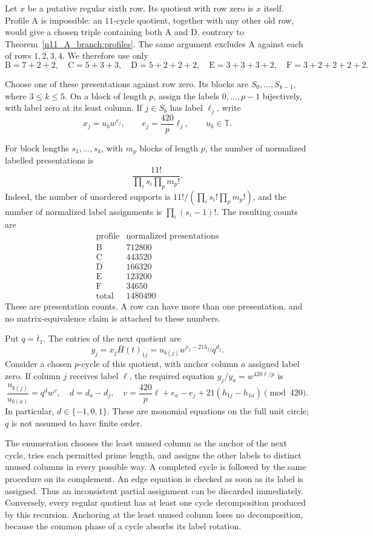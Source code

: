 \documentclass[11pt,a4paper]{article}
\theoremstyle{plain}
\theoremstyle{definition}
\theoremstyle{plain}
\begin{document}
\medskip
Let $x$ be a putative regular sixth row. Its quotient with row zero is $x$ itself. Profile $\mathrm{A}$ is impossible: an $11$-cycle quotient, together with any other old row, would give a chosen triple containing both $\mathrm{A}$ and $\mathrm{D}$, contrary to Theorem~\ref{n11_A_branch:profiles}. The same argument excludes $\mathrm{A}$ against each of rows $1,2,3,4$. We therefore use only
$$\mathrm{B}=7+2+2,\quad \mathrm{C}=5+3+3,\quad \mathrm{D}=5+2+2+2,\quad
\mathrm{E}=3+3+3+2,\quad \mathrm{F}=3+2+2+2+2.$$

Choose one of these presentations against row zero. Its blocks are $S_0,\ldots,S_{k-1}$, where $3\leq k\leq5$. On a block of length $p$, assign the labels $0,\ldots,p-1$ bijectively, with label zero at its least column. If $j\in S_b$ has label $\ell_j$, write
\[
x_j=u_bw^{e_j},\qquad e_j=\frac{420}{p}\ell_j,\qquad u_b\in\mathbb T.
\]

For block lengths $s_1,\ldots,s_k$, with $m_p$ blocks of length $p$, the number of normalized labelled presentations is
$$\frac{11!}{\prod_i s_i\prod_p m_p!}.$$
Indeed, the number of unordered supports is $11!/(\prod_i s_i!\prod_p m_p!)$, and the number of normalized label assignments is $\prod_i(s_i-1)!$. The resulting counts are
\[
\begin{array}{c|r}
\text{profile}&\text{normalized presentations}\\\hline
\mathrm{B}&712800\\\mathrm{C}&443520\\\mathrm{D}&166320\\\mathrm{E}&123200\\\mathrm{F}&34650\\\hline
\text{total}&1480490
\end{array}
\]
These are presentation counts. A row can have more than one presentation, and no matrix-equivalence claim is attached to these numbers.

Put $q=\bar t_1$. The entries of the next quotient are
$$y_j=x_j\bar H(t)_{1j}
=u_{b(j)}w^{e_j-21h_{1j}}q^{d_j}.$$
Consider a chosen $p$-cycle of this quotient, with anchor column $a$ assigned label zero. If column $j$ receives label $\ell$, the required equation $y_j/y_a=w^{420\ell/p}$ is
\[
\frac{u_{b(j)}}{u_{b(a)}}=q^dw^v,
\quad d=d_a-d_j,
\quad v=\frac{420}{p}\ell+e_a-e_j+21(h_{1j}-h_{1a})\pmod {420}.
\]
In particular, $d\in\{-1,0,1\}$. These are monomial equations on the full unit circle; $q$ is not assumed to have finite order.

The enumeration chooses the least unused column as the anchor of the next cycle, tries each permitted prime length, and assigns the other labels to distinct unused columns in every possible way. A completed cycle is followed by the same procedure on its complement. An edge equation is checked as soon as its label is assigned. Thus an inconsistent partial assignment can be discarded immediately. Conversely, every regular quotient has at least one cycle decomposition produced by this recursion. Anchoring at the least unused column loses no decomposition, because the common phase of a cycle absorbs its label rotation.
\end{document}
